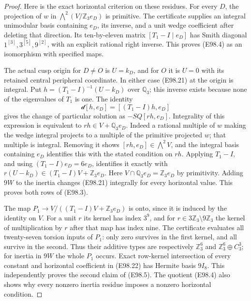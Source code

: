 \begin{proof}
Here is the exact horizontal criterion on these residues.
For every $D$, the projection of $w$ in
$\bigwedge^2(V/\mathbb Z_3e_D)$ is primitive. The
certificate supplies an integral unimodular basis
containing $e_D$, its inverse, and a unit wedge
coefficient after deleting that direction. Its
ten-by-eleven matrix $[T_1-I\mid e_D]$ has Smith
diagonal $1^{[3]},3^{[5]},9^{[2]}$, with an explicit
rational right inverse. This proves (E98.4) as an
isomorphism with specified maps.

The actual cusp origin for $D\ne O$ is $U=k_D$,
and for $O$ it is $U=0$ with its retained central
peripheral coordinate. In either case (E98.21) at
the origin is integral. Put
$h=(T_1-I)^{-1}(U-k_D)$ over $\mathbb Q_3$; this
inverse exists because none of the eigenvalues of
$T_1$ is one. The identity
\[
           \mathcal d[h,e_D]=[(T_1-I)h,e_D]
 \tag{E98.24}
\]
gives the change of particular solution as
$-SQ[rh,e_D]$. Integrality of this expression is
equivalent to $rh\in V+\mathbb Q_3e_D$.
Indeed a rational multiple of $w$ making the wedge
integral projects to a multiple of the primitive
projected $w$; that multiple is integral. Removing
it shows $[rh,e_D]\in\bigwedge^2V$, and the integral
basis containing $e_D$ identifies this with the
stated condition on $rh$. Applying $T_1-I$, and using
$(T_1-I)e_D=6e_D$, identifies it exactly with
$r(U-k_D)\in(T_1-I)V+\mathbb Z_3e_D$.
Here $V\cap\mathbb Q_3e_D=\mathbb Z_3e_D$ by
primitivity. Adding $9W$ to the inertia changes
(E98.21) integrally for every horizontal value.
This proves both rows of (E98.3).

The map $P_1\to V/((T_1-I)V+\mathbb Z_3e_D)$ is
onto, since it is induced by the identity on $V$.
For a unit $r$ its kernel has index $3^9$, and for
$r\in3\mathbb Z_3\setminus9\mathbb Z_3$ the
kernel of multiplication by $r$ after that map has
index nine. The certificate evaluates all twenty-seven
torsion inputs of $P_1$: only zero survives in the
first kernel, and all survive in the second.
Thus their additive types are respectively
$\mathbb Z_3^6$ and $\mathbb Z_3^6\oplus C_3^3$;
for inertia in $9W$ the whole $P_1$ occurs. Exact
row-kernel intersection of every constant and
horizontal coefficient in (E98.22) has Hermite
basis $9I_8$. This independently proves the second
claim of (E98.5). The quotient (E98.4) also shows
why every nonzero inertia residue imposes a
nonzero horizontal condition.


\end{proof}
